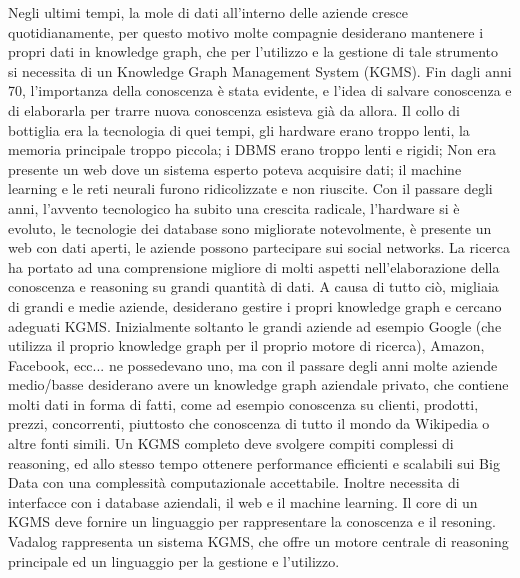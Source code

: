 Negli ultimi tempi, la mole di dati all'interno delle aziende cresce quotidianamente, per questo motivo molte compagnie desiderano mantenere i propri dati in knowledge graph, che per l'utilizzo e la gestione di tale strumento si necessita di un Knowledge Graph Management System (KGMS). \newline
Fin dagli anni 70, l'importanza della conoscenza \`e stata evidente, e l'idea di salvare conoscenza e di elaborarla per trarre nuova conoscenza esisteva gi\`a da allora. Il collo di bottiglia era la tecnologia di quei tempi, gli hardware erano troppo lenti, la memoria principale troppo piccola; i DBMS erano troppo lenti e rigidi; Non era presente un web dove un sistema esperto poteva acquisire dati; il machine learning e le reti neurali furono ridicolizzate e non riuscite.\newline
Con il passare degli anni, l'avvento tecnologico ha subito una crescita radicale, l'hardware si \`e evoluto, le tecnologie dei database sono migliorate notevolmente, \`e presente un web con dati aperti, le aziende possono partecipare sui social networks. La ricerca ha portato ad una comprensione migliore di molti aspetti nell'elaborazione della conoscenza e reasoning su grandi quantit\`a di dati.\newline
A causa di tutto ci\`o, migliaia di grandi e medie aziende, desiderano gestire i propri knowledge graph e cercano adeguati KGMS. Inizialmente soltanto le grandi aziende ad esempio Google (che utilizza il proprio knowledge graph per il proprio motore di ricerca), Amazon, Facebook, ecc... ne possedevano uno, ma con il passare degli anni molte aziende medio/basse desiderano avere un knowledge graph aziendale privato, che contiene molti dati in forma di fatti, come ad esempio conoscenza su clienti, prodotti, prezzi, concorrenti, piuttosto che conoscenza di tutto il mondo da Wikipedia o altre fonti simili.\newline
Un KGMS completo deve svolgere compiti complessi di reasoning, ed allo stesso tempo ottenere performance efficienti e scalabili sui Big Data con una complessit\`a computazionale accettabile. Inoltre necessita di interfacce con i database aziendali, il web e il machine learning. Il core di un KGMS deve fornire un linguaggio per rappresentare la conoscenza e il resoning.\newline \newline
Vadalog rappresenta un sistema KGMS, che offre un motore centrale di reasoning principale ed un linguaggio per la gestione e l'utilizzo.\newline

